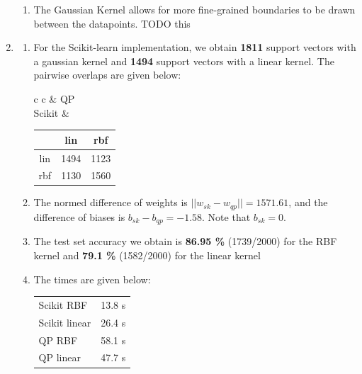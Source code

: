 \documentclass[12pt]{article}
\begin{document}
\begin{enumerate}[label=(\alph*)]
\begin{enumerate}[label=\roman*.]
        \item The Gaussian Kernel allows for more fine-grained boundaries to be drawn between the datapoints. TODO this
    \end{enumerate}

    \item \begin{enumerate}[label=\roman*.]
        \item For the Scikit-learn implementation, we obtain \textbf{1811} support vectors with a gaussian kernel and \textbf{1494} support vectors with a linear kernel. The pairwise overlaps are given below:
        \begin{center}
            \begin{tabular}{c c}
                & QP \\
                Scikit & 
            \begin{tabular}{c|c|c|}
                    & lin  & rbf  \\   
                \hline
                lin & 1494 & 1123 \\
                \hline
                rbf & 1130 & 1560 \\
                \hline
            \end{tabular}
            \end{tabular}
        \end{center}

    \item The normed difference of weights is $||w_{sk} - w_{qp}|| = 1571.61$, and the difference of biases is $b_{sk} - b_{qp} = -1.58$. Note that $b_{sk} = 0$.

    \item The test set accuracy we obtain is \textbf{86.95 \%} (1739/2000) for the RBF kernel and \textbf{79.1 \%} (1582/2000) for the linear kernel

        \item The times are given below:
            \begin{center}
                \begin{tabular}{|l|c|}
                    \hline
                    Scikit RBF & 13.8 s \\
                    Scikit linear & 26.4 s\\
                    QP RBF & 58.1 s\\
                    QP linear & 47.7 s\\
                    \hline
                \end{tabular}
            \end{center}
    \end{enumerate}

\end{enumerate}
\end{document}

